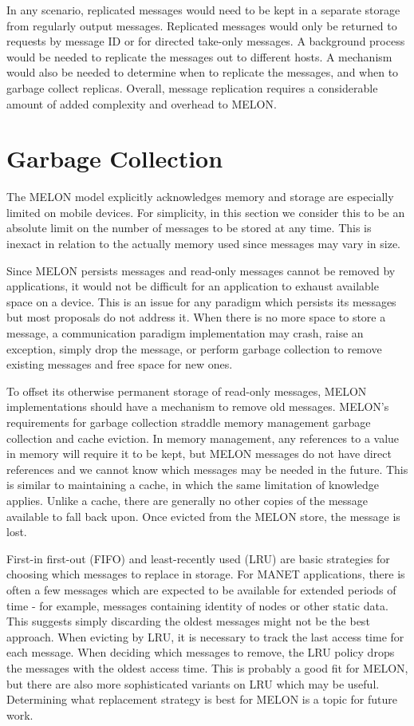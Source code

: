 In any scenario, replicated messages would need to be kept in a separate storage from regularly output messages. Replicated messages would only be returned to requests by message ID or for directed take-only messages. A background process would be needed to replicate the messages out to different hosts. A mechanism would also be needed to determine when to replicate the messages, and when to garbage collect replicas. Overall, message replication requires a considerable amount of added complexity and overhead to MELON.

\section{Garbage Collection}

The MELON model explicitly acknowledges memory and storage are especially limited on mobile devices. For simplicity, in this section we consider this to be an absolute limit on the number of messages to be stored at any time. This is inexact in relation to the actually memory used since messages may vary in size.

Since MELON persists messages and read-only messages cannot be removed by applications, it would not be difficult for an application to exhaust available space on a device. This is an issue for any paradigm which persists its messages but most proposals do not address it. When there is no more space to store a message, a communication paradigm implementation may crash, raise an exception, simply drop the message, or perform garbage collection to remove existing messages and free space for new ones.

To offset its otherwise permanent storage of read-only messages, MELON implementations should have a mechanism to remove old messages. MELON's requirements for garbage collection straddle memory management garbage collection and cache eviction. In memory management, any references to a value in memory will require it to be kept, but MELON messages do not have direct references and we cannot know which messages may be needed in the future. This is similar to maintaining a cache, in which the same limitation of knowledge applies. Unlike a cache, there are generally no other copies of the message available to fall back upon. Once evicted from the MELON store, the message is lost.

First-in first-out (FIFO) and least-recently used (LRU) are basic strategies for choosing which messages to replace in storage. For MANET applications, there is often a few messages which are expected to be available for extended periods of time - for example, messages containing identity of nodes or other static data. This suggests simply discarding the oldest messages might not be the best approach. When evicting by LRU, it is necessary to track the last access time for each message. When deciding which messages to remove, the LRU policy drops the messages with the oldest access time. This is probably a good fit for MELON, but there are also more sophisticated variants on LRU which may be useful. Determining what replacement strategy is best for MELON is a topic for future work.

